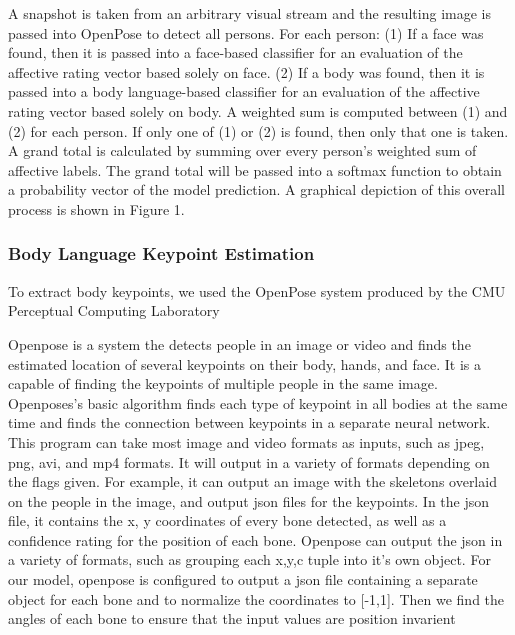 \documentclass{article}
\begin{document}
A snapshot is taken from an arbitrary visual stream and the resulting image is passed into OpenPose to detect all persons. For each person: (1) If a face was found, then it is passed into a face-based classifier for an evaluation of the affective rating vector based solely on face. (2) If a body was found, then it is passed into a body language-based classifier for an evaluation of the affective rating vector based solely on body. A weighted sum is computed between (1) and (2) for each person. If only one of (1) or (2) is found, then only that one is taken. A grand total is calculated by summing over every person's weighted sum of affective labels. The grand total will be passed into a softmax function to obtain a probability vector of the model prediction. A graphical depiction of this overall process is shown in Figure 1.

\subsubsection{Body Language Keypoint Estimation}

To extract body keypoints, we used the OpenPose system produced by the CMU Perceptual Computing Laboratory \citep{cao2017realtime} \citep{simon2017hand} \citep{wei2016cpm}

Openpose is a system the detects people in an image or video and finds the estimated location of several keypoints on their body, hands, and face. It is a capable of finding the keypoints of multiple people in the same image. Openposes’s	 basic algorithm finds each type of keypoint in all bodies at the same time and finds the connection between keypoints in a separate neural network. This program can take most image and video formats as inputs, such as jpeg, png, avi, and mp4 formats. It will output in a variety of formats depending on the flags given. For example, it can output an image with the skeletons overlaid on the people in the image, and output json files for the keypoints. In the json file, it contains the x, y coordinates of every bone detected, as well as a confidence rating for the position of each bone. Openpose can output the json in a variety of formats, such as grouping each x,y,c tuple into it’s own object. For our model, openpose is configured to output a json file containing a separate object for each bone and to normalize the coordinates to [-1,1]. Then we find the angles of each bone to ensure that the input values are position invarient
\end{document}
